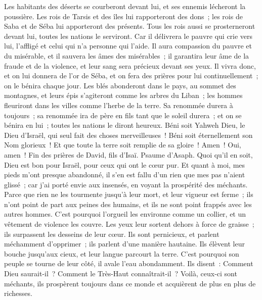 \begin{multicols}{2}
Les habitants des déserts se courberont devant lui, et ses ennemis lécheront la poussière.
Les rois de Tarsis et des îles lui rapporteront des dons~; les rois de Saba et de Séba lui apporteront des présents.
Tous les rois aussi se prosterneront devant lui, toutes les nations le serviront.
Car il délivrera le pauvre qui crie vers lui, l'affligé et celui qui n'a personne qui l'aide.
Il aura compassion du pauvre et du misérable, et il sauvera les âmes des misérables~;
il garantira leur âme de la fraude et de la violence, et leur sang sera précieux devant ses yeux.
Il vivra donc, et on lui donnera de l'or de Séba, et on fera des prières pour lui continuellement~; on le bénira chaque jour.
Les blés abonderont dans le pays, au sommet des montagnes, et leurs épis s'agiteront comme les arbres du Liban~; les hommes fleuriront dans les villes comme l'herbe de la terre.
Sa renommée durera à toujours~; sa renommée ira de père en fils tant que le soleil durera~; et on se bénira en lui~; toutes les nations le diront heureux.
Béni soit Yahweh Dieu, le Dieu d'Israël, qui seul fait des choses merveilleuses~!
Béni soit éternellement son Nom glorieux~! Et que toute la terre soit remplie de sa gloire~! Amen~! Oui, amen~!
Fin des prières de David, fils d'Isaï.
\VerseOne{}Psaume d'Asaph. Quoi qu'il en soit, Dieu est bon pour Israël, pour ceux qui ont le cœur pur.
Et quant à moi, mes pieds m’ont presque abandonné, il s’en est fallu d’un rien que mes pas n’aient glissé~;
car j'ai porté envie aux insensés, en voyant la prospérité des méchants.
Parce que rien ne les tourmente jusqu'à leur mort, et leur vigueur est ferme~;
ils n'ont point de part aux peines des humains, et ils ne sont point frappés avec les autres hommes.
C'est pourquoi l'orgueil les environne comme un collier, et un vêtement de violence les couvre.
Les yeux leur sortent dehors à force de graisse~; ils surpassent les desseins de leur cœur.
Ils sont pernicieux, et parlent méchamment d'opprimer~; ils parlent d'une manière hautaine.
Ils élèvent leur bouche jusqu'aux cieux, et leur langue parcourt la terre.
C'est pourquoi son peuple se tourne de leur côté, il avale l'eau abondamment.
Ils disent~: Comment Dieu saurait-il~? Comment le Très-Haut connaîtrait-il~?
Voilà, ceux-ci sont méchants, ils prospèrent toujours dans ce monde et acquièrent de plus en plus de richesses.

\end{multicols}

